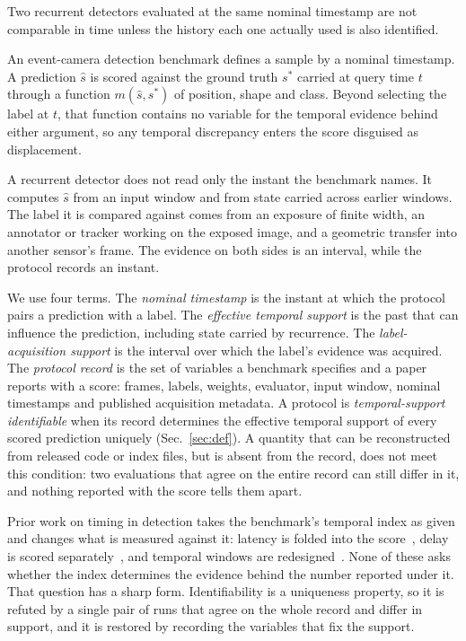 \documentclass[10pt,twocolumn,letterpaper]{article}
\begin{document}
Two recurrent detectors evaluated at the same nominal timestamp are not comparable in time unless the history each one actually used is also identified.

An event-camera detection benchmark defines a sample by a nominal timestamp. A prediction $\hat{s}$ is scored against the ground truth $s^{*}$ carried at query time $t$ through a function $m(\hat{s},s^{*})$ of position, shape and class. Beyond selecting the label at $t$, that function contains no variable for the temporal evidence behind either argument, so any temporal discrepancy enters the score disguised as displacement.

A recurrent detector does not read only the instant the benchmark names. It computes $\hat{s}$
from an input window and from state carried across earlier windows. The label it is
compared against comes from an exposure of finite width, an annotator or tracker working on the
exposed image, and a geometric transfer into another sensor's frame. The evidence on both sides
is an interval, while the protocol records an instant.

We use four terms. The \emph{nominal timestamp} is the instant at which the protocol pairs a prediction with a label. The \emph{effective temporal support} is the past that can influence the prediction, including state carried by recurrence. The \emph{label-acquisition support} is the interval over which the label's evidence was acquired. The \emph{protocol record} is the set of variables a benchmark specifies and a paper reports with a score: frames, labels, weights, evaluator, input window, nominal timestamps and published acquisition metadata. A protocol is \emph{temporal-support identifiable} when its record determines the effective temporal support of every scored prediction uniquely (Sec.~\ref{sec:def}). A quantity that can be reconstructed from released code or index files, but is absent from the record, does not meet this condition: two evaluations that agree on the entire record can still differ in it, and nothing reported with the score tells them apart.

Prior work on timing in detection takes the benchmark's temporal index as given and changes what is measured against it: latency is folded into the score~\cite{li2020streaming,yang2022streamyolo,chu2026stare}, delay is scored separately~\cite{mao2019delay}, and temporal windows are redesigned~\cite{gehrig2023rvt,zubic2024ssm,sui2026astw}. None of these asks whether the index determines the evidence behind the number reported under it. That question has a sharp form. Identifiability is a uniqueness property, so it is refuted by a single pair of runs that agree on the whole record and differ in support, and it is restored by recording the variables that fix the support.
\end{document}
